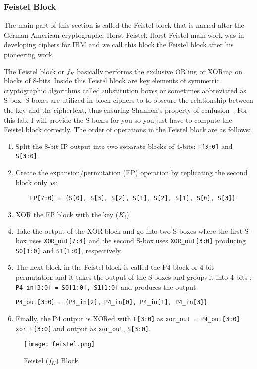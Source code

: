 \documentclass{article}
\begin{document}
\subsubsection{Feistel Block}

The main part of this section is called the Feistel block that is
named after the German-American cryptographer Horst Feistel.  Horst
Feistel main work was in developing ciphers for IBM and we call this
block the Feistel block after his pioneering work.

The Feistel block or $f_K$ basically performs the exclusive OR'ing or
XORing on blocks of $8$-bits.  Inside this Feistel block are key elements of
symmetric cryptographic algorithms called substitution boxes or
sometimes abbreviated as S-box.  S-boxes are utilized in block ciphers to
to obscure the relationship between the key and the ciphertext, thus
ensuring Shannon's property of confusion~\cite{10.5555/1721909}.   For
this lab, I will provide the S-boxes for you so you just have to
compute the Feistel block correctly.  The order of operations in the
Feistel block are as follows:
\begin{enumerate}
\item Split the $8$-bit IP output into two separate blocks of $4$-bits:
  \verb!F[3:0]! and \verb!S[3:0]!.
\item Create the expansion/permutation (EP) operation by replicating
  the second block only as:
  \begin{verbatim}
    EP[7:0] = {S[0], S[3], S[2], S[1], S[2], S[1], S[0], S[3]}
\end{verbatim}
\item XOR the EP block with the key ($K_i$)
\item Take the output of the XOR block and go into two S-boxes where
  the first S-box uses \verb!XOR_out[7:4]! and the second S-box uses
  \verb!XOR_out[3:0]! producing \verb!S0[1:0]! and \verb!S1[1:0]!, respectively.
\item The next block in the Feistel block is called the P4 block or
  $4$-bit permutation and
  it takes the output of the S-boxes and groups it into $4$-bits :
  \verb!P4_in[3:0] = S0[1:0], S1[1:0]!  and produces the output
\begin{verbatim}
P4_out[3:0] = {P4_in[2], P4_in[0], P4_in[1], P4_in[3]}
\end{verbatim}
  \item Finally, the P4 output is XORed with \verb!F[3:0]! as
    \verb!xor_out = P4_out[3:0] xor F[3:0]! and output as
    \verb!xor_out!, \verb!S[3:0]!.
\end{enumerate}
\begin{figure} [t!]
  \centering
  \texttt{[image: feistel.png]}
  \caption{Feistel ($f_K$) Block}
  \label{feistel.png}
\end{figure}
\end{document}

